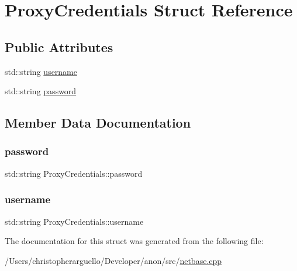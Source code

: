 \hypertarget{struct_proxy_credentials}{}\section{Proxy\+Credentials Struct Reference}
\label{struct_proxy_credentials}
\subsection*{Public Attributes}
\begin{DoxyCompactItemize}
\item 
std\+::string \mbox{\hyperlink{struct_proxy_credentials_a1b5e426884ddec6a55c60561c1e85c6a}{username}}
\item 
std\+::string \mbox{\hyperlink{struct_proxy_credentials_a380630fa3a709e51f7a692e757c876d7}{password}}
\end{DoxyCompactItemize}


\subsection{Member Data Documentation}
\mbox{\label{struct_proxy_credentials_a380630fa3a709e51f7a692e757c876d7}} 
\subsubsection{\texorpdfstring{password}{password}}
{\footnotesize\ttfamily std\+::string Proxy\+Credentials\+::password}

\mbox{\label{struct_proxy_credentials_a1b5e426884ddec6a55c60561c1e85c6a}} 
\subsubsection{\texorpdfstring{username}{username}}
{\footnotesize\ttfamily std\+::string Proxy\+Credentials\+::username}



The documentation for this struct was generated from the following file\+:\begin{DoxyCompactItemize}
\item 
/\+Users/christopherarguello/\+Developer/anon/src/\mbox{\hyperlink{netbase_8cpp}{netbase.\+cpp}}\end{DoxyCompactItemize}
